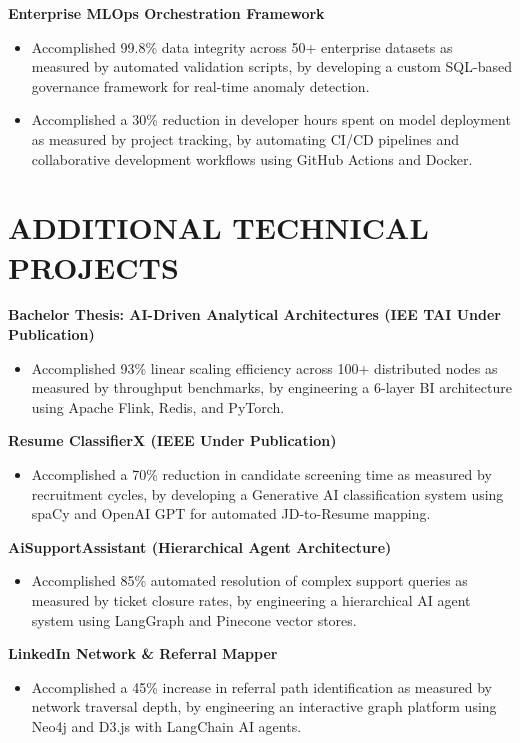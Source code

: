 \documentclass[10pt, a4paper]{article}
\begin{document}
\vspace{4pt}
\noindent
\textbf{Enterprise MLOps Orchestration Framework}
\begin{itemize}
    \item Accomplished 99.8\% data integrity across 50+ enterprise datasets as measured by automated validation scripts, by developing a custom SQL-based governance framework for real-time anomaly detection.
    \item Accomplished a 30\% reduction in developer hours spent on model deployment as measured by project tracking, by automating CI/CD pipelines and collaborative development workflows using GitHub Actions and Docker.
\end{itemize}

\section{ADDITIONAL TECHNICAL PROJECTS}

\noindent
\textbf{Bachelor Thesis: AI-Driven Analytical Architectures (IEE TAI Under Publication)}
\begin{itemize}
    \item Accomplished 93\% linear scaling efficiency across 100+ distributed nodes as measured by throughput benchmarks, by engineering a 6-layer BI architecture using Apache Flink, Redis, and PyTorch.
\end{itemize}

\vspace{4pt}
\noindent
\textbf{Resume ClassifierX (IEEE Under Publication)}
\begin{itemize}
    \item Accomplished a 70\% reduction in candidate screening time as measured by recruitment cycles, by developing a Generative AI classification system using spaCy and OpenAI GPT for automated JD-to-Resume mapping.
\end{itemize}

\vspace{4pt}
\noindent
\textbf{AiSupportAssistant (Hierarchical Agent Architecture)}
\begin{itemize}
    \item Accomplished 85\% automated resolution of complex support queries as measured by ticket closure rates, by engineering a hierarchical AI agent system using LangGraph and Pinecone vector stores.
\end{itemize}

\vspace{4pt}
\noindent
\textbf{LinkedIn Network \& Referral Mapper}
\begin{itemize}
    \item Accomplished a 45\% increase in referral path identification as measured by network traversal depth, by engineering an interactive graph platform using Neo4j and D3.js with LangChain AI agents.
\end{itemize}
\end{document}

